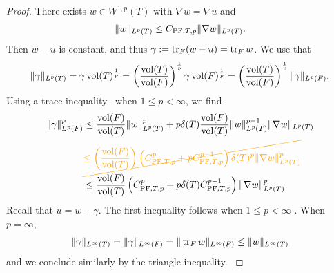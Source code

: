 \documentclass[10pt,letterpaper]{article}
\newcommand\cye[1]{%
  \protect\leavevmode
  \begingroup
    \color{red!35!yellow}%
    #1%
  \endgroup
}
\begin{document}
\begin{proof}
    There exists $w \in W^{1,p}(T)$ with $\nabla w = \nabla u$ and 
    \begin{gather*}
        \| w \|_{L^{p}(T)}
        \leq 
        C_{\PF,T,p} 
        \| \nabla w \|_{L^{p}(T)} %
        .
    \end{gather*}
    Then $w-u$ is constant, and thus $\gamma := \operatorname{tr}_{F} (w-u) = \operatorname{tr}_{F} w$. 
    We use that 
    \begin{gather*}
        \| \gamma \|_{L^{p}(T)}
        =
        \gamma \operatorname{vol}(T)^\frac{1}{p}
        =
        \left( \frac{ \operatorname{vol}(T) }{ \operatorname{vol}(F) } \right)^\frac{1}{p}
        \gamma 
        \operatorname{vol}(F)^\frac{1}{p}
        =
        \left( \frac{ \operatorname{vol}(T) }{ \operatorname{vol}(F) } \right)^\frac{1}{p}
        \| \gamma \|_{L^{p}(F)}
        .
    \end{gather*}
    Using a trace inequality~\cite[Lemma~2.8]{veeser2012poincare} when $1 \leq p < \infty$, we find 
    \begin{align*}
        \| \gamma \|_{L^{p}(F)}^{p}
        &
        \leq 
        \frac{ \vol(F) }{ \vol(T) }
        \| w \|_{L^{p}(T)}^{p}
        +
        p
        \diam(T)
        \frac{ \vol(F) }{ \vol(T) }
        \| w \|_{L^{p}(T)}^{p-1}
        \| \nabla w \|_{L^{p}(T)}
        \\&
        \cye{\cancel{\leq 
        \left( \frac{ \vol(F) }{ \vol(T) } \right)
        \left( C_{\PF,T,p}^{p} + p C_{\PF,T,p}^{p-1} \right) 
        \diam(T)^{p}
        \| \nabla w \|_{L^{p}(T)}^{p}}}
        \\&
        \leq 
        \frac{ \vol(F) }{ \vol(T) } 
        \left( C_{\PF,T,p}^{p} + p \diam(T) C_{\PF,T,p}^{p-1} \right) 
        \| \nabla w \|_{L^{p}(T)}^{p}
        .
    \end{align*}
    Recall that $u = w - \gamma$. The first inequality follows \cye{when $1 \leq p < \infty$}. \cye{When $p = \infty$, 
    \begin{align*}
            \| \gamma \|_{L^{\infty}(T)}
        =
        \| \gamma \|_{L^{\infty}(F)}
        =
        \| \operatorname{tr}_{F} w \|_{L^{\infty}(F)}
        \leq
        \| w \|_{L^{\infty}(T)}
    \end{align*}
and we conclude similarly by the triangle inequality.    
    }
    

\end{proof}
\end{document}
